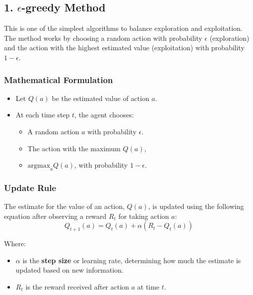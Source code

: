 \documentclass[
  letterpaper,
]{krantz}
\providecommand{\tightlist}{%
  \setlength{\itemsep}{0pt}\setlength{\parskip}{0pt}}\usepackage{longtable,booktabs,array}
\theoremstyle{plain}
\theoremstyle{definition}
\theoremstyle{definition}
\theoremstyle{remark}
\begin{document}
\subsection{\texorpdfstring{1. \(\epsilon\)-greedy
Method}{1. \textbackslash epsilon-greedy Method}}\label{epsilon-greedy-method}

This is one of the simplest algorithms to balance exploration and
exploitation. The method works by choosing a random action with
probability \(\epsilon\) (exploration) and the action with the highest
estimated value (exploitation) with probability \(1 - \epsilon\).

\subsubsection{Mathematical Formulation}\label{mathematical-formulation}

\begin{itemize}
\tightlist
\item
  Let \(Q(a)\) be the estimated value of action \(a\).
\item
  At each time step \(t\), the agent chooses:

  \begin{itemize}
  \tightlist
  \item
    A random action \(a\) with probability \(\epsilon\).
  \item
    The action with the maximum \(Q(a)\),
  \item
    \(\text{argmax}_a Q(a)\), with probability \({1 - \epsilon}.\)
  \end{itemize}
\end{itemize}

\subsubsection{Update Rule}\label{update-rule}

The estimate for the value of an action, \(Q(a)\), is updated using the
following equation after observing a reward \(R_t\) for taking action
\(a\): \[
Q_{t+1}(a) = Q_t(a) + \alpha \left( R_t - Q_t(a) \right)
\]

Where:

\begin{itemize}
\item
  \(\alpha\) is the \textbf{step size} or learning rate, determining how
  much the estimate is updated based on new information.
\item
  \(R_t\) is the reward received after action \(a\) at time \(t\).
\end{itemize}
\end{document}
